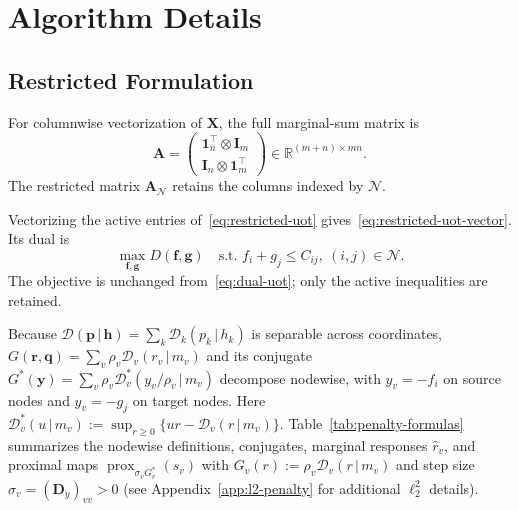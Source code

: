\section{Algorithm Details}
\label{app:algorithm-details}

\subsection{Restricted Formulation}
\label{app:pduot-details}

For columnwise vectorization of $\mathbf X$, the full marginal-sum matrix is
\begin{equation*}
\mathbf A=\begin{pmatrix}\mathbf1_n^\top\otimes\mathbf I_m\\\mathbf I_n\otimes\mathbf1_m^\top\end{pmatrix}\in\mathbb R^{(m+n)\times mn}.
\end{equation*}
The restricted matrix $\mathbf A_{\mathcal N}$ retains the columns indexed by $\mathcal N$.
\begin{definition}
\label{def:restricted-uot}
Vectorizing the active entries of~\eqref{eq:restricted-uot} gives~\eqref{eq:restricted-uot-vector}.
Its dual is
\begin{equation*}
\max_{\mathbf f,\mathbf g}D(\mathbf f,\mathbf g)\quad\text{s.t. }f_i+g_j\leq C_{ij},\ (i,j)\in\mathcal N.
\end{equation*}
The objective is unchanged from~\eqref{eq:dual-uot}; only the active inequalities are retained.
\end{definition}

Because $\mathcal{D}(\mathbf{p}\,|\,\mathbf{h})=\sum_k \mathcal{D}_k(p_k\,|\,h_k)$ is separable across coordinates, $G(\mathbf{r},\mathbf{q})=\sum_v \rho_v \mathcal{D}_v(r_v\,|\,m_v)$ and its conjugate $G^*(\mathbf{y})=\sum_v \rho_v \mathcal{D}_v^*(y_v/\rho_v\,|\,m_v)$ decompose nodewise, with $y_v=-f_i$ on source nodes and $y_v=-g_j$ on target nodes.
Here $\mathcal{D}_v^*(u\,|\,m_v):=\sup_{r\geq 0}\{ur-\mathcal{D}_v(r\,|\,m_v)\}$.
Table~\ref{tab:penalty-formulas} summarizes the nodewise definitions, conjugates, marginal responses $\widehat{r}_v$, and proximal maps $\operatorname{prox}_{\sigma_v G_v^*}(s_v)$ with $G_v(r):=\rho_v\mathcal{D}_v(r\,|\,m_v)$ and step size $\sigma_v=(\mathbf{D}_y)_{vv}>0$ (see Appendix~\ref{app:l2-penalty} for additional $\ell_2^2$ details).

